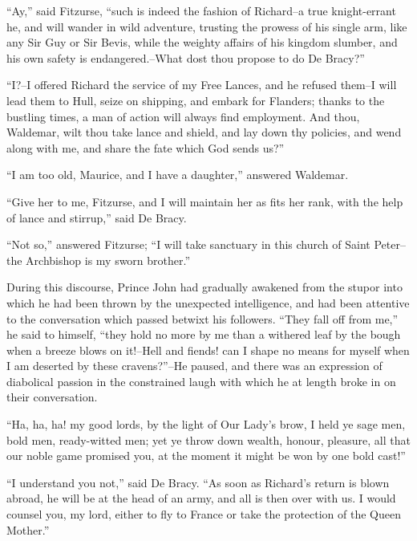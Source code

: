 ``Ay,'' said Fitzurse, ``such is indeed the fashion of Richard--a true
knight-errant he, and will wander in wild adventure, trusting the
prowess of his single arm, like any Sir Guy or Sir Bevis, while the
weighty affairs of his kingdom slumber, and his own safety is
endangered.--What dost thou propose to do De Bracy?''

``I?--I offered Richard the service of my Free Lances, and he refused
them--I will lead them to Hull, seize on shipping, and embark for
Flanders; thanks to the bustling times, a man of action will always find
employment. And thou, Waldemar, wilt thou take lance and shield, and lay
down thy policies, and wend along with me, and share the fate which God
sends us?''

``I am too old, Maurice, and I have a daughter,'' answered Waldemar.

``Give her to me, Fitzurse, and I will maintain her as fits her rank,
with the help of lance and stirrup,'' said De Bracy.

``Not so,'' answered Fitzurse; ``I will take sanctuary in this church of
Saint Peter--the Archbishop is my sworn brother.''

During this discourse, Prince John had gradually awakened from the
stupor into which he had been thrown by the unexpected intelligence, and
had been attentive to the conversation which passed betwixt his
followers. ``They fall off from me,'' he said to himself, ``they hold no
more by me than a withered leaf by the bough when a breeze blows on
it!--Hell and fiends! can I shape no means for myself when I am deserted
by these cravens?''--He paused, and there was an expression of
diabolical passion in the constrained laugh with which he at length
broke in on their conversation.

``Ha, ha, ha! my good lords, by the light of Our Lady's brow, I held ye
sage men, bold men, ready-witted men; yet ye throw down wealth, honour,
pleasure, all that our noble game promised you, at the moment it might
be won by one bold cast!''

``I understand you not,'' said De Bracy. ``As soon as Richard's return
is blown abroad, he will be at the head of an army, and all is then over
with us. I would counsel you, my lord, either to fly to France or take
the protection of the Queen Mother.''

